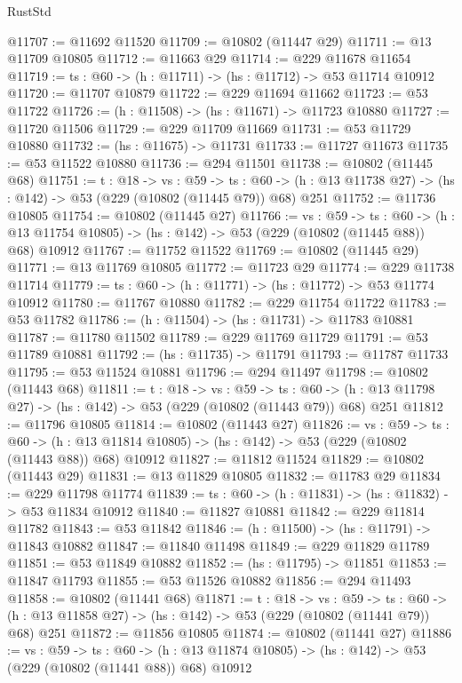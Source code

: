 \begin{lexlean}{RustStd}
\begin{coremodule}
@11707 := @11692 @11520
@11709 := @10802 (@11447 @29)
@11711 := @13 @11709 @10805
@11712 := @11663 @29
@11714 := @229 @11678 @11654
@11719 := {ts : @60} -> (h : @11711) -> (hs : @11712) -> @53 @11714 @10912
@11720 := @11707 @10879
@11722 := @229 @11694 @11662
@11723 := @53 @11722
@11726 := (h : @11508) -> (hs : @11671) -> @11723 @10880
@11727 := @11720 @11506
@11729 := @229 @11709 @11669
@11731 := @53 @11729 @10880
@11732 := (hs : @11675) -> @11731
@11733 := @11727 @11673
@11735 := @53 @11522 @10880
@11736 := @294 @11501
@11738 := @10802 (@11445 @68)
@11751 := {t : @18} ->
  {vs : @59} ->
  {ts : @60} -> (h : @13 @11738 @27) -> (hs : @142) -> @53 (@229 (@10802 (@11445 @79)) @68) @251
@11752 := @11736 @10805
@11754 := @10802 (@11445 @27)
@11766 := {vs : @59} ->
  {ts : @60} ->
  (h : @13 @11754 @10805) -> (hs : @142) -> @53 (@229 (@10802 (@11445 @88)) @68) @10912
@11767 := @11752 @11522
@11769 := @10802 (@11445 @29)
@11771 := @13 @11769 @10805
@11772 := @11723 @29
@11774 := @229 @11738 @11714
@11779 := {ts : @60} -> (h : @11771) -> (hs : @11772) -> @53 @11774 @10912
@11780 := @11767 @10880
@11782 := @229 @11754 @11722
@11783 := @53 @11782
@11786 := (h : @11504) -> (hs : @11731) -> @11783 @10881
@11787 := @11780 @11502
@11789 := @229 @11769 @11729
@11791 := @53 @11789 @10881
@11792 := (hs : @11735) -> @11791
@11793 := @11787 @11733
@11795 := @53 @11524 @10881
@11796 := @294 @11497
@11798 := @10802 (@11443 @68)
@11811 := {t : @18} ->
  {vs : @59} ->
  {ts : @60} -> (h : @13 @11798 @27) -> (hs : @142) -> @53 (@229 (@10802 (@11443 @79)) @68) @251
@11812 := @11796 @10805
@11814 := @10802 (@11443 @27)
@11826 := {vs : @59} ->
  {ts : @60} ->
  (h : @13 @11814 @10805) -> (hs : @142) -> @53 (@229 (@10802 (@11443 @88)) @68) @10912
@11827 := @11812 @11524
@11829 := @10802 (@11443 @29)
@11831 := @13 @11829 @10805
@11832 := @11783 @29
@11834 := @229 @11798 @11774
@11839 := {ts : @60} -> (h : @11831) -> (hs : @11832) -> @53 @11834 @10912
@11840 := @11827 @10881
@11842 := @229 @11814 @11782
@11843 := @53 @11842
@11846 := (h : @11500) -> (hs : @11791) -> @11843 @10882
@11847 := @11840 @11498
@11849 := @229 @11829 @11789
@11851 := @53 @11849 @10882
@11852 := (hs : @11795) -> @11851
@11853 := @11847 @11793
@11855 := @53 @11526 @10882
@11856 := @294 @11493
@11858 := @10802 (@11441 @68)
@11871 := {t : @18} ->
  {vs : @59} ->
  {ts : @60} -> (h : @13 @11858 @27) -> (hs : @142) -> @53 (@229 (@10802 (@11441 @79)) @68) @251
@11872 := @11856 @10805
@11874 := @10802 (@11441 @27)
@11886 := {vs : @59} ->
  {ts : @60} ->
  (h : @13 @11874 @10805) -> (hs : @142) -> @53 (@229 (@10802 (@11441 @88)) @68) @10912

\end{coremodule}
\end{lexlean}
